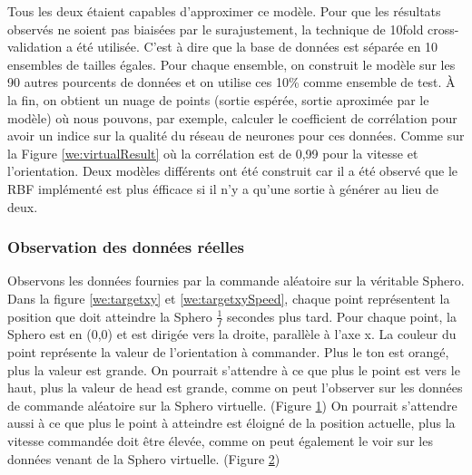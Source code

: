 Tous les deux étaient capables d'approximer ce modèle.
Pour que les résultats observés ne soient pas biaisées par le surajustement, la technique de 10fold cross-validation a été utilisée.
C'est à dire que la base de données est séparée en 10 ensembles de tailles égales.
Pour chaque ensemble, on construit le modèle sur les 90 autres pourcents de données et on utilise ces 10\% comme ensemble de test.
À la fin, on obtient un nuage de points (sortie espérée, sortie aproximée par le modèle) où nous pouvons, par exemple,
calculer le coefficient de corrélation pour avoir un indice sur la qualité du réseau de neurones pour ces données.
Comme sur la Figure \ref{we:virtualResult} où la corrélation est de 0,99 pour la vitesse et l'orientation.
Deux modèles différents ont été construit car il a été observé que le RBF implémenté est plus éfficace si il n'y a qu'une sortie à générer au lieu de deux.

\subsubsection{Observation des données réelles}
\begin{figure}
 \centering
 \label{we:targetvirtual}
\end{figure}
\begin{figure}
 \centering
 \label{we:targetvirtualSpeed}
\end{figure}

Observons les données fournies par la commande aléatoire sur la véritable Sphero.
Dans la figure \ref{we:targetxy} et \ref{we:targetxySpeed}, chaque point représentent la position que doit atteindre la Sphero $\frac{1}{f}$ secondes plus tard.
Pour chaque point, la Sphero est en (0,0) et est dirigée vers la droite, parallèle à l'axe x.
La couleur du point représente la valeur de l'orientation à commander.
Plus le ton est orangé, plus la valeur est grande.
On pourrait s'attendre à ce que plus le point est vers le haut, plus la valeur de head est grande, comme on peut l'observer sur les données de commande aléatoire sur la Sphero virtuelle. (Figure \ref{we:targetvirtual})
On pourrait s'attendre aussi à ce que plus le point à atteindre est éloigné de la position actuelle, plus la vitesse commandée doit être élevée, comme on peut également le voir sur les données venant de la Sphero virtuelle. (Figure \ref{we:targetvirtualSpeed})

